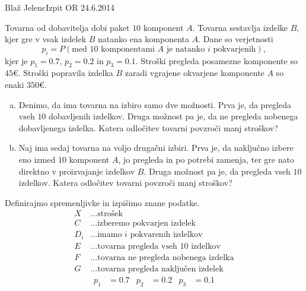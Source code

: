 \begin{naloga}{Blaž Jelenc}{Izpit OR 24.6.2014}
\begin{vprasanje}
Tovarna od dobavitelja dobi paket $10$ komponent $A$.
Tovarna sestavlja izdelke $B$,
kjer gre v vsak izdelek $B$ natanko ena komponenta $A$.
Dane so verjetnosti
$$
p_i = P(\text{med $10$ komponentami $A$ je natanko $i$ pokvarjenih}),
$$
kjer je $p_1 = 0.7$, $p_2 = 0.2$ in $p_3 = 0.1$.
Stroški pregleda posamezne komponente so $45 €$.
Stroški popravila izdelka $B$ zaradi vgrajene okvarjene komponente $A$
so enaki $350 €$.
\begin{enumerate}[(a)]
\item Denimo, da ima tovarna na izbiro samo dve možnosti.
Prva je, da pregleda vseh $10$ dobavljenih izdelkov.
Druga možnost pa je, da ne pregleda nobenega dobavljenega izdelka.
Katera odločitev tovarni povzroči manj stroškov?

\item Naj ima sedaj tovarna na voljo drugačni izbiri.
Prva je, da naključno izbere eno izmed $10$ komponent $A$,
jo pregleda in po potrebi zamenja,
ter gre nato direktno v proizvajanje izdelkov $B$.
Druga možnost pa je, da pregleda vseh $10$ izdelkov.
Katera odločitev tovarni povzroči manj stroškov?
\end{enumerate}
\end{vprasanje}

\begin{odgovor}
Definirajmo spremenljivke in izpišimo znane podatke.
\begin{align*}
X &\dots \text{strošek} \\
C &\dots \text{izberemo pokvarjen izdelek} \\
D_i &\dots \text{imamo $i$ pokvarenih izdelkov} \\
E &\dots \text{tovarna pregleda vseh $10$ izdelkov} \\
F &\dots \text{tovarna ne pregleda nobenega izdelka} \\
G &\dots \text{tovarna pregleda naključen izdelek}
\end{align*}
\begin{align*}
p_1 &= 0.7 & p_2 &= 0.2 & p_3 &= 0.1
\end{align*}


\end{odgovor}
\end{naloga}
